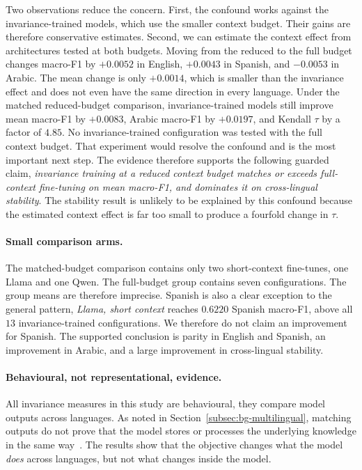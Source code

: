 Two observations reduce the concern. First, the confound works against the invariance-trained models,
which use the smaller context budget. Their gains are therefore conservative estimates. Second, we
can estimate the context effect from architectures tested at both budgets. Moving from the reduced to
the full budget changes macro-F1 by $+0.0052$ in English, $+0.0043$ in Spanish, and $-0.0053$ in
Arabic. The mean change is only $+0.0014$, which is smaller than the invariance effect and does not
even have the same direction in every language. Under the matched reduced-budget comparison,
invariance-trained models still improve mean macro-F1 by $+0.0083$, Arabic macro-F1 by $+0.0197$,
and Kendall $\tau$ by a factor of $4.85$. No invariance-trained configuration was tested with the
full context budget. That experiment would resolve the confound and is the most important next step.
The evidence therefore supports the following guarded claim,
\emph{invariance training at a reduced context budget matches or exceeds full-context fine-tuning on
mean macro-F1, and dominates it on cross-lingual stability}. The stability result is
unlikely to be explained by this confound because the estimated context effect is far too small to
produce a fourfold change in $\tau$.

\paragraph{Small comparison arms.}
The matched-budget comparison contains only two short-context fine-tunes, one Llama and one Qwen. The
full-budget group contains seven configurations. The group means are therefore imprecise. Spanish is
also a clear exception to the general pattern, \emph{Llama, short context} reaches $0.6220$ Spanish
macro-F1, above all $13$ invariance-trained configurations. We therefore do not claim an improvement
for Spanish. The supported conclusion is parity in English and Spanish, an improvement in Arabic,
and a large improvement in cross-lingual stability.

\paragraph{Behavioural, not representational, evidence.}
All invariance measures in this study are behavioural, they compare model outputs across languages.
As noted in Section~\ref{subsec:bg-multilingual}, matching outputs do not prove that the model stores or
processes the underlying knowledge in the same way~\cite{ifergan2024beneathsurfaceconsistencyexploring}.
The results show that the objective changes what the model \emph{does} across languages, but not what
changes inside the model.


